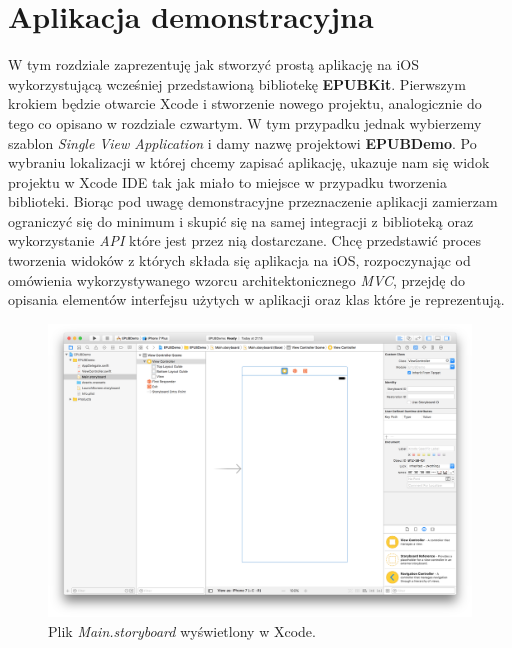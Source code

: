 \chapter{Aplikacja demonstracyjna}

W tym rozdziale zaprezentuję jak stworzyć prostą aplikację na iOS wykorzystującą wcześniej przedstawioną bibliotekę \textbf{EPUBKit}. Pierwszym krokiem będzie otwarcie Xcode i stworzenie nowego projektu, analogicznie do tego co opisano w rozdziale czwartym. W tym przypadku jednak wybierzemy szablon \textit{Single View Application} i damy nazwę projektowi \textbf{EPUBDemo}\cite{UsingSwiftWithCocoaAndObjectiveC}. Po wybraniu lokalizacji w której chcemy zapisać aplikację, ukazuje nam się widok projektu w Xcode IDE tak jak miało to miejsce w przypadku tworzenia biblioteki. Biorąc pod uwagę demonstracyjne przeznaczenie aplikacji zamierzam ograniczyć się do minimum i skupić się na samej integracji z biblioteką oraz wykorzystanie \textit{API} które jest przez nią dostarczane. Chcę przedstawić proces tworzenia widoków z których składa się aplikacja na iOS, rozpoczynając od omówienia wykorzystywanego wzorcu architektonicznego \textit{MVC}, przejdę do opisania elementów interfejsu użytych w aplikacji oraz klas które je reprezentują.

\begin{figure}[ht!]
  \centering
  \includegraphics[width=120mm]{images/chapter-5-image-1-storyboard.png}
  \caption{Plik \textit{Main.storyboard} wyświetlony w Xcode.}
  \label{chapter-5-image-1-storyboard}
\end{figure}

